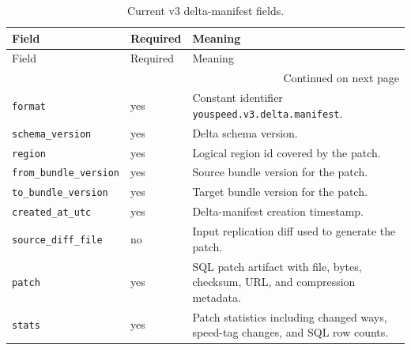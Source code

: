 \documentclass{article}
\begin{document}
{\scriptsize
\begin{longtable}{@{}p{3.5cm}p{1.1cm}p{6.6cm}@{}}
\caption{Current v3 delta-manifest fields.}
\label{tab:contract_delta_manifest}\\
\toprule
Field & Required & Meaning \\
\midrule
\endfirsthead
\toprule
Field & Required & Meaning \\
\midrule
\endhead
\midrule
\multicolumn{3}{r}{Continued on next page} \\
\midrule
\endfoot
\bottomrule
\endlastfoot
\nolinkurl{format} & yes & Constant identifier \nolinkurl{youspeed.v3.delta.manifest}. \\
\nolinkurl{schema_version} & yes & Delta schema version. \\
\nolinkurl{region} & yes & Logical region id covered by the patch. \\
\nolinkurl{from_bundle_version} & yes & Source bundle version for the patch. \\
\nolinkurl{to_bundle_version} & yes & Target bundle version for the patch. \\
\nolinkurl{created_at_utc} & yes & Delta-manifest creation timestamp. \\
\nolinkurl{source_diff_file} & no & Input replication diff used to generate the patch. \\
\nolinkurl{patch} & yes & SQL patch artifact with file, bytes, checksum, URL, and compression metadata. \\
\nolinkurl{stats} & yes & Patch statistics including changed ways, speed-tag changes, and SQL row counts. \\
\end{longtable}
}
\end{document}

